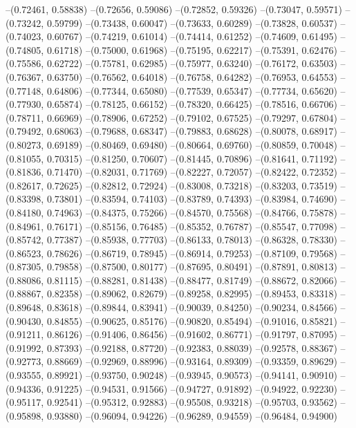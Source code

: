--(0.72461, 0.58838)
--(0.72656, 0.59086)
--(0.72852, 0.59326)
--(0.73047, 0.59571)
--(0.73242, 0.59799)
--(0.73438, 0.60047)
--(0.73633, 0.60289)
--(0.73828, 0.60537)
--(0.74023, 0.60767)
--(0.74219, 0.61014)
--(0.74414, 0.61252)
--(0.74609, 0.61495)
--(0.74805, 0.61718)
--(0.75000, 0.61968)
--(0.75195, 0.62217)
--(0.75391, 0.62476)
--(0.75586, 0.62722)
--(0.75781, 0.62985)
--(0.75977, 0.63240)
--(0.76172, 0.63503)
--(0.76367, 0.63750)
--(0.76562, 0.64018)
--(0.76758, 0.64282)
--(0.76953, 0.64553)
--(0.77148, 0.64806)
--(0.77344, 0.65080)
--(0.77539, 0.65347)
--(0.77734, 0.65620)
--(0.77930, 0.65874)
--(0.78125, 0.66152)
--(0.78320, 0.66425)
--(0.78516, 0.66706)
--(0.78711, 0.66969)
--(0.78906, 0.67252)
--(0.79102, 0.67525)
--(0.79297, 0.67804)
--(0.79492, 0.68063)
--(0.79688, 0.68347)
--(0.79883, 0.68628)
--(0.80078, 0.68917)
--(0.80273, 0.69189)
--(0.80469, 0.69480)
--(0.80664, 0.69760)
--(0.80859, 0.70048)
--(0.81055, 0.70315)
--(0.81250, 0.70607)
--(0.81445, 0.70896)
--(0.81641, 0.71192)
--(0.81836, 0.71470)
--(0.82031, 0.71769)
--(0.82227, 0.72057)
--(0.82422, 0.72352)
--(0.82617, 0.72625)
--(0.82812, 0.72924)
--(0.83008, 0.73218)
--(0.83203, 0.73519)
--(0.83398, 0.73801)
--(0.83594, 0.74103)
--(0.83789, 0.74393)
--(0.83984, 0.74690)
--(0.84180, 0.74963)
--(0.84375, 0.75266)
--(0.84570, 0.75568)
--(0.84766, 0.75878)
--(0.84961, 0.76171)
--(0.85156, 0.76485)
--(0.85352, 0.76787)
--(0.85547, 0.77098)
--(0.85742, 0.77387)
--(0.85938, 0.77703)
--(0.86133, 0.78013)
--(0.86328, 0.78330)
--(0.86523, 0.78626)
--(0.86719, 0.78945)
--(0.86914, 0.79253)
--(0.87109, 0.79568)
--(0.87305, 0.79858)
--(0.87500, 0.80177)
--(0.87695, 0.80491)
--(0.87891, 0.80813)
--(0.88086, 0.81115)
--(0.88281, 0.81438)
--(0.88477, 0.81749)
--(0.88672, 0.82066)
--(0.88867, 0.82358)
--(0.89062, 0.82679)
--(0.89258, 0.82995)
--(0.89453, 0.83318)
--(0.89648, 0.83618)
--(0.89844, 0.83941)
--(0.90039, 0.84250)
--(0.90234, 0.84566)
--(0.90430, 0.84855)
--(0.90625, 0.85176)
--(0.90820, 0.85494)
--(0.91016, 0.85821)
--(0.91211, 0.86126)
--(0.91406, 0.86456)
--(0.91602, 0.86771)
--(0.91797, 0.87095)
--(0.91992, 0.87393)
--(0.92188, 0.87720)
--(0.92383, 0.88039)
--(0.92578, 0.88367)
--(0.92773, 0.88669)
--(0.92969, 0.88996)
--(0.93164, 0.89309)
--(0.93359, 0.89629)
--(0.93555, 0.89921)
--(0.93750, 0.90248)
--(0.93945, 0.90573)
--(0.94141, 0.90910)
--(0.94336, 0.91225)
--(0.94531, 0.91566)
--(0.94727, 0.91892)
--(0.94922, 0.92230)
--(0.95117, 0.92541)
--(0.95312, 0.92883)
--(0.95508, 0.93218)
--(0.95703, 0.93562)
--(0.95898, 0.93880)
--(0.96094, 0.94226)
--(0.96289, 0.94559)
--(0.96484, 0.94900)
